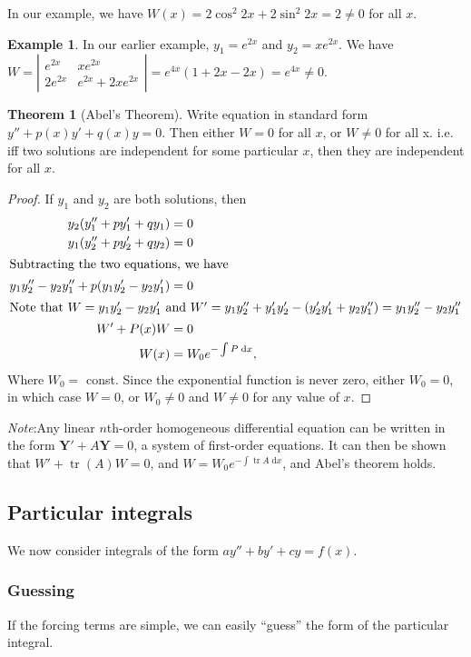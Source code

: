 \documentclass[a4paper]{article}
\theoremstyle{definition}
\newtheorem*{thm}{Theorem}
\newtheorem*{eg}{Example}
\newcommand{\mb}[1]{\mathbf{#1}}
\newcommand{\note}{\noindent \emph{Note}:\;}
\renewcommand{\d}{\mathrm{d}}
\DeclareMathOperator\tr{tr}
\begin{document}
In our example, we have $W(x) = 2\cos^2 2x + 2\sin^2 2x = 2 \not= 0$ for all $x$.

\begin{eg}
  In our earlier example, $y_1 = e^{2x}$ and $y_2 = xe^{2x}$. We have $W = \left|\begin{matrix} e^{2x} & xe^{2x}\\ 2e^{2x} & e^{2x} + 2xe^{2x} \end{matrix}\right| = e^{4x}(1 + 2x - 2x) = e^{4x} \not= 0$.
\end{eg}

\begin{thm}[Abel's Theorem]
  Write equation in standard form $y'' + p(x)y' + q(x) y = 0$. Then either $W = 0$ for all $x$, or $W \not= 0$ for all x. i.e. iff two solutions are independent for some particular $x$, then they are independent for all $x$.
\end{thm}

\begin{proof}
  If $y_1$ and $y_2$ are both solutions, then 
  \begin{align*}
    y_2(y_1'' + py_1' + qy_1) &= 0\\
    y_1(y_2'' + py_2' + qy_2) &= 0\\
    \intertext{Subtracting the two equations, we have}
    y_1y_2'' - y_2y_1'' + p(y_1y_2' - y_2y_1') &= 0\\
    \intertext{Note that $W =y_1y_2' - y_2y_1'$ and $W' = y_1y_2'' + y_1'y_2' - (y_2'y_1' + y_2y_1'') = y_1y_2'' - y_2y_1''$}
    W' + P(x)W &= 0\\
    W(x) &= W_0 e^{-\int P\; \d x},
  \end{align*}
  Where $W_0 = $ const. Since the exponential function is never zero, either $W_0 = 0$, in which case $W = 0$, or $W_0 \not= 0$ and $W \not= 0$ for any value of $x$.
\end{proof}
\note Any linear $n$th-order homogeneous differential equation can be written in the form $\mb{Y}' + A\mb{Y} = 0$, a system of first-order equations. It can then be shown that $W' + \tr(A)W = 0$, and $W = W_0e^{-\int \tr A\;\d x}$, and Abel's theorem holds.

\subsection{Particular integrals}
We now consider integrals of the form $ay'' + by' + cy = f(x)$.

\subsubsection{Guessing}
If the forcing terms are simple, we can easily ``guess'' the form of the particular integral.
\end{document}
